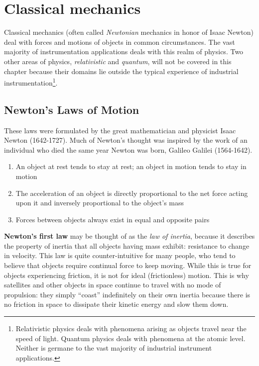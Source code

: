 \filbreak
\section{Classical mechanics}

Classical mechanics (often called \textit{Newtonian} mechanics in honor of Isaac Newton) deal with forces and motions of objects in common circumstances.  The vast majority of instrumentation applications deals with this realm of physics.  Two other areas of physics, \textit{relativistic} and \textit{quantum}, will not be covered in this chapter because their domains lie outside the typical experience of industrial instrumentation\footnote{Relativistic physics deals with phenomena arising as objects travel near the speed of light.  Quantum physics deals with phenomena at the atomic level.  Neither is germane to the vast majority of industrial instrument applications.}.




\filbreak
\subsection{Newton's Laws of Motion}

These laws were formulated by the great mathematician and physicist Isaac Newton (1642-1727).  Much of Newton's thought was inspired by the work of an individual who died the same year Newton was born, Galileo Galilei (1564-1642).   

\begin{enumerate}
\item An object at rest tends to stay at rest; an object in motion tends to stay in motion
\item The acceleration of an object is directly proportional to the net force acting upon it and inversely proportional to the object's mass
\item Forces between objects always exist in equal and opposite pairs
\end{enumerate}

\vskip 10pt

\textbf{Newton's first law} may be thought of as the \textit{law of inertia}, because it describes the property of inertia that all objects having mass exhibit: resistance to change in velocity.  This law is quite counter-intuitive for many people, who tend to believe that objects require continual force to keep moving.  While this is true for objects experiencing friction, it is not for ideal (frictionless) motion.  This is why satellites and other objects in space continue to travel with no mode of propulsion: they simply ``coast'' indefinitely on their own inertia because there is no friction in space to dissipate their kinetic energy and slow them down.  

